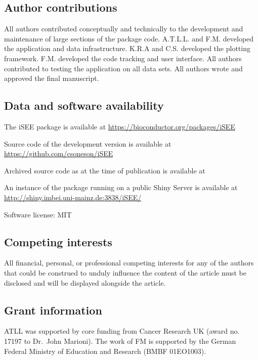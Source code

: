 \documentclass[10pt,a4paper,twocolumn]{article}
\begin{document}
\subsection*{Author contributions}
All authors contributed conceptually and technically to the development and maintenance of large sections of the package code.
A.T.L.L. and F.M. developed the application and data infrastructure.
K.R.A and C.S. developed the plotting framework.
F.M. developed the code tracking and user interface.
All authors contributed to testing the application on all data sets.
All authors wrote and approved the final manuscript.

\subsection*{Data and software availability}
The iSEE package is available at \url{https://bioconductor.org/packages/iSEE}

Source code of the development version is available at \url{https://github.com/csoneson/iSEE}

Archived source code as at the time of publication is available at %

An instance of the package running on a public Shiny Server is available at \url{http://shiny.imbei.uni-mainz.de:3838/iSEE/}



Software license: MIT


\subsection*{Competing interests}
All financial, personal, or professional competing interests for any of the authors that
could be construed to unduly influence the content of the article must be disclosed and
will be displayed alongside the article.

\subsection*{Grant information}
ATLL was supported by core funding from Cancer Research UK (award no. 17197 to Dr.\ John Marioni).
The work of FM is supported by the German Federal Ministry of Education and Research (BMBF 01EO1003).
\end{document}
